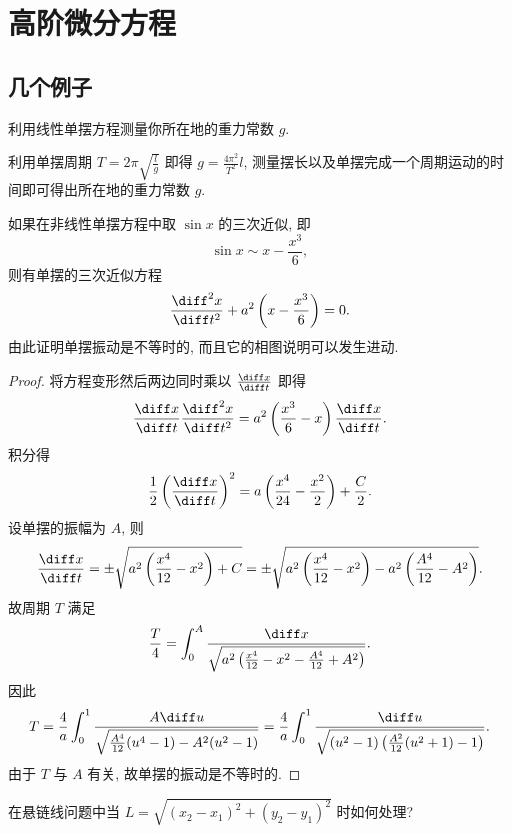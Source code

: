 \setcounter{chapter}{4}
\chapter{高阶微分方程}



\section{几个例子}



\begin{exercise}
  利用线性单摆方程测量你所在地的重力常数 $g$.
\end{exercise}

\begin{solve} 
  利用单摆周期 $T=2\pi\sqrt{\frac{l}{g}}$ 即得 $g=\frac{4\pi^2}{T^2}l$, 
  测量摆长以及单摆完成一个周期运动的时间即可得出所在地的重力常数 $g$.
\end{solve}



\begin{exercise}
  如果在非线性单摆方程中取 $\sin x$ 的三次近似, 即
  \[\sin x\sim x-\frac{x^3}{6},\]
  则有单摆的三次近似方程
  \[\frac{\diff^2x}{\diff t^2}+a^2\left(x-\frac{x^3}{6}\right)=0.\]
  由此证明单摆振动是不等时的, 而且它的相图说明可以发生进动.
\end{exercise}

\begin{proof}
  将方程变形然后两边同时乘以 $\frac{\diff x}{\diff t}$ 即得
  \[\frac{\diff x}{\diff t}\frac{\diff^2x}{\diff t^2}
    = a^2\left(\frac{x^3}{6}-x\right)\frac{\diff x}{\diff t}.\]
  积分得
  \[\frac{1}{2}\left(\frac{\diff x}{\diff t}\right)^2
    = a\left(\frac{x^4}{24}-\frac{x^2}{2}\right)+\frac{C}{2}.\]
  设单摆的振幅为 $A$, 则
  \[\frac{\diff x}{\diff t}=\pm\sqrt{a^2\left(\frac{x^4}{12}-x^2\right)+C}
    = \pm\sqrt{a^2\left(\frac{x^4}{12}-x^2\right)-a^2\left(\frac{A^4}{12}-A^2\right)}.\]
  故周期 $T$ 满足
  \[\frac{T}{4}=\int_0^A\frac{\diff x}{\sqrt{a^2\left(\frac{x^4}{12}-x^2-\frac{A^4}{12}+A^2\right)}}.\]
  因此
  \[T=\frac{4}{a}\int_0^1\frac{A\diff u}{\sqrt{\frac{A^4}{12}(u^4-1)-A^2(u^2-1)}}
    = \frac{4}{a}\int_0^1\frac{\diff u}{\sqrt{(u^2-1)\left(\frac{A^2}{12}(u^2+1)-1\right)}}.\]
  由于 $T$ 与 $A$ 有关, 故单摆的振动是不等时的.
\end{proof}



\begin{exercise}
  在悬链线问题中当 $L=\sqrt{(x_2-x_1)^2+(y_2-y_1)^2}$ 时如何处理?
\end{exercise}


